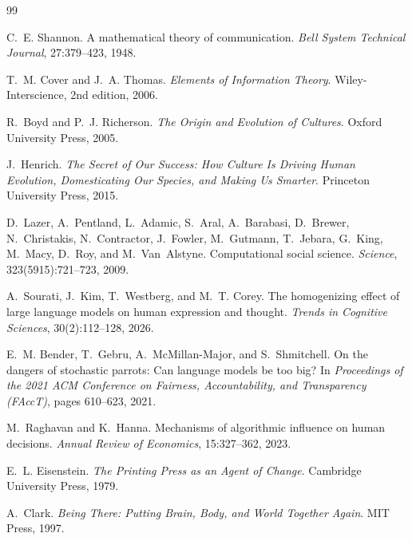 \documentclass[12pt,a4paper]{article}
\theoremstyle{definition}
\theoremstyle{plain}
\theoremstyle{remark}
\begin{document}
\newpage


\begin{thebibliography}{99}

C.~E. Shannon.
\newblock A mathematical theory of communication.
\newblock \emph{Bell System Technical Journal}, 27:379--423, 1948.

T.~M. Cover and J.~A. Thomas.
\newblock \emph{Elements of Information Theory}.
\newblock Wiley-Interscience, 2nd edition, 2006.

R.~Boyd and P.~J. Richerson.
\newblock \emph{The Origin and Evolution of Cultures}.
\newblock Oxford University Press, 2005.

J.~Henrich.
\newblock \emph{The Secret of Our Success: How Culture Is Driving Human Evolution,
Domesticating Our Species, and Making Us Smarter}.
\newblock Princeton University Press, 2015.

D.~Lazer, A.~Pentland, L.~Adamic, S.~Aral, A.~Barabasi, D.~Brewer,
N.~Christakis, N.~Contractor, J.~Fowler, M.~Gutmann, T.~Jebara, G.~King,
M.~Macy, D.~Roy, and M.~Van~Alstyne.
\newblock Computational social science.
\newblock \emph{Science}, 323(5915):721--723, 2009.

A.~Sourati, J.~Kim, T.~Westberg, and M.~T. Corey.
\newblock The homogenizing effect of large language models on human expression
and thought.
\newblock \emph{Trends in Cognitive Sciences}, 30(2):112--128, 2026.

E.~M. Bender, T.~Gebru, A.~McMillan-Major, and S.~Shmitchell.
\newblock On the dangers of stochastic parrots: Can language models be too big?
\newblock In \emph{Proceedings of the 2021 ACM Conference on Fairness,
Accountability, and Transparency (FAccT)}, pages 610--623, 2021.

M.~Raghavan and K.~Hanna.
\newblock Mechanisms of algorithmic influence on human decisions.
\newblock \emph{Annual Review of Economics}, 15:327--362, 2023.

E.~L. Eisenstein.
\newblock \emph{The Printing Press as an Agent of Change}.
\newblock Cambridge University Press, 1979.

A.~Clark.
\newblock \emph{Being There: Putting Brain, Body, and World Together Again}.
\newblock MIT Press, 1997.


\end{thebibliography}
\end{document}
